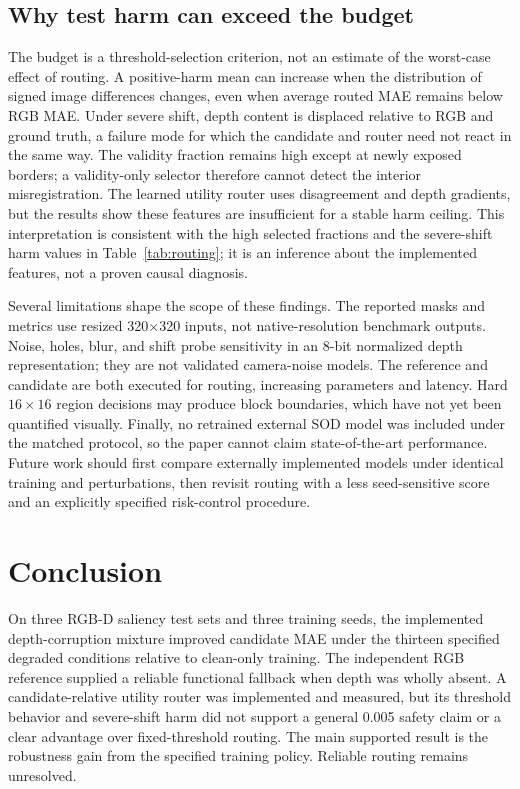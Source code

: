\documentclass[11pt]{article}
\begin{document}
\subsection{Why test harm can exceed the budget}
The budget is a threshold-selection criterion, not an estimate of the worst-case effect of routing. A positive-harm mean can increase when the distribution of signed image differences changes, even when average routed MAE remains below RGB MAE. Under severe shift, depth content is displaced relative to RGB and ground truth, a failure mode for which the candidate and router need not react in the same way. The validity fraction remains high except at newly exposed borders; a validity-only selector therefore cannot detect the interior misregistration. The learned utility router uses disagreement and depth gradients, but the results show these features are insufficient for a stable harm ceiling. This interpretation is consistent with the high selected fractions and the severe-shift harm values in Table~\ref{tab:routing}; it is an inference about the implemented features, not a proven causal diagnosis.

Several limitations shape the scope of these findings. The reported masks and metrics use resized 320$\times$320 inputs, not native-resolution benchmark outputs. Noise, holes, blur, and shift probe sensitivity in an 8-bit normalized depth representation; they are not validated camera-noise models. The reference and candidate are both executed for routing, increasing parameters and latency. Hard $16\times16$ region decisions may produce block boundaries, which have not yet been quantified visually. Finally, no retrained external SOD model was included under the matched protocol, so the paper cannot claim state-of-the-art performance. Future work should first compare externally implemented models under identical training and perturbations, then revisit routing with a less seed-sensitive score and an explicitly specified risk-control procedure.

\section{Conclusion}
On three RGB-D saliency test sets and three training seeds, the implemented depth-corruption mixture improved candidate MAE under the thirteen specified degraded conditions relative to clean-only training. The independent RGB reference supplied a reliable functional fallback when depth was wholly absent. A candidate-relative utility router was implemented and measured, but its threshold behavior and severe-shift harm did not support a general 0.005 safety claim or a clear advantage over fixed-threshold routing. The main supported result is the robustness gain from the specified training policy. Reliable routing remains unresolved.
\end{document}
